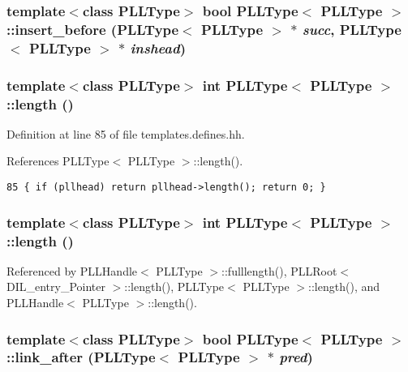 \subsubsection{\setlength{\rightskip}{0pt plus 5cm}template$<$class PLLType$>$ bool PLLType$<$ PLLType $>$::insert\_\-before (PLLType$<$ PLLType $>$ $\ast$ {\em succ}, PLLType$<$ PLLType $>$ $\ast$ {\em inshead})\hspace{0.3cm}{\tt  [inline]}}\label{classPLLType_a25}


\subsubsection{\setlength{\rightskip}{0pt plus 5cm}template$<$class PLLType$>$ int PLLType$<$ PLLType $>$::length ()\hspace{0.3cm}{\tt  [inline]}}\label{classPLLType_a17}




Definition at line 85 of file templates.defines.hh.

References PLLType$<$ PLLType $>$::length().



\footnotesize\begin{verbatim}85 { if (pllhead) return pllhead->length(); return 0; } 
\end{verbatim}\normalsize 
{}
\subsubsection{\setlength{\rightskip}{0pt plus 5cm}template$<$class PLLType$>$ int PLLType$<$ PLLType $>$::length ()\hspace{0.3cm}{\tt  [inline]}}\label{classPLLType_a8}




Referenced by PLLHandle$<$ PLLType $>$::fulllength(), PLLRoot$<$ DIL\_\-entry\_\-Pointer $>$::length(), PLLType$<$ PLLType $>$::length(), and PLLHandle$<$ PLLType $>$::length().
\subsubsection{\setlength{\rightskip}{0pt plus 5cm}template$<$class PLLType$>$ bool PLLType$<$ PLLType $>$::link\_\-after (PLLType$<$ PLLType $>$ $\ast$ {\em pred})\hspace{0.3cm}{\tt  [inline]}}\label{classPLLType_a22}


